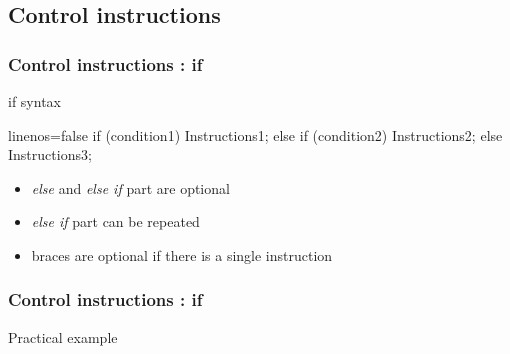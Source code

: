 \subsection[Control]{Control instructions}

\begin{frame}[fragile]
  \frametitle{Control instructions : if}
  \begin{block}{if syntax}
    \begin{cppcode*}{linenos=false}
      if (condition1) {
        Instructions1;
      } else if (condition2) {
        Instructions2;
      } else {
        Instructions3;
      } 
    \end{cppcode*}
    \vspace{-0.5cm}
    \begin{itemize}
      \item {\it else} and {\it else if} part are optional
      \item {\it else if} part can be repeated
      \item braces are optional if there is a single instruction
    \end{itemize}
  \end{block}
\end{frame}

\begin{frame}[fragile]
  \frametitle{Control instructions : if}
  \begin{exampleblock}{Practical example}
  \end{exampleblock}
\end{frame}

